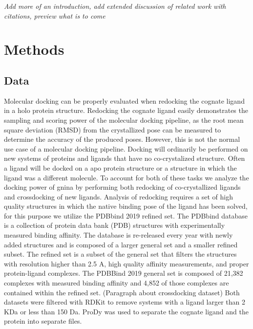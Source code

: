\documentclass[journal=jcisd8,manuscript=article]{achemso}
\begin{document}
\textit{Add more of an introduction, add extended discussion of related work with citations, preview what is to come}

\section{Methods}


\subsection{Data}
Molecular docking can be properly evaluated when redocking the cognate ligand in a holo protein structure. Redocking the cognate ligand easily demonstrates the sampling and scoring power of the molecular docking pipeline, as the root mean square deviation (RMSD) from the crystallized pose can be measured to determine the accuracy of the produced poses. However, this is not the normal use case of a molecular docking pipeline.  Docking will ordinarily be performed on new systems of proteins and ligands that have no co-crystalized structure. Often a ligand will be docked on a apo protein structure or a structure in which the ligand was a different molecule. To account for both of these tasks we analyze the docking power of gnina by performing both redocking of co-crystallized ligands and crossdocking of new ligands. 
Analysis of redocking requires a set of high quality structures in which the native binding pose of the ligand has been solved, for this purpose we utilize the PDBbind 2019 refined set. The PDBbind database is a collection of protein data bank (PDB) structures with experimentally measured binding affinity. The database is re-released every year with newly added structures and is composed of a larger general set and a smaller refined subset. The refined set is a subset of the general set that filters the structures with resolution higher than 2.5 A, high quality affinity measurements, and proper protein-ligand complexes.  The PDBBind 2019 general set is composed of 21,382 complexes with measured binding affinity and 4,852 of those complexes are contained within the refined set.
(Paragraph about crossdocking dataset)
Both datasets were filtered with RDKit to remove systems with a ligand larger than 2 KDa or less than 150 Da. ProDy was used to separate the cognate ligand and the protein into separate files.
\end{document}

